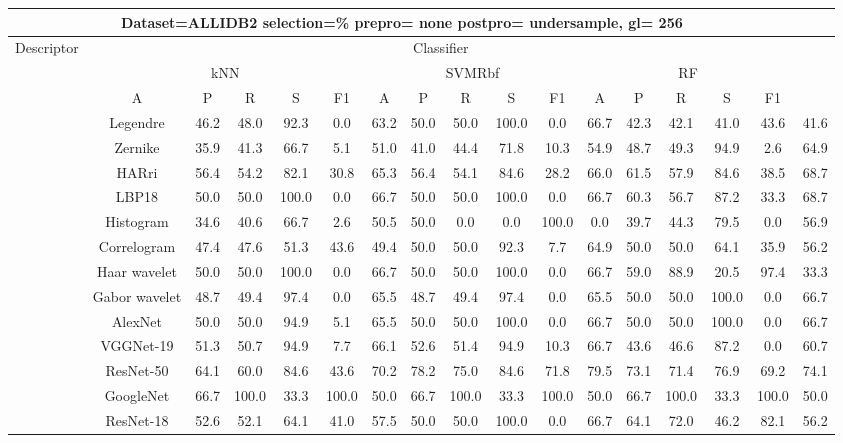 \documentclass[12pt,italian]{article}
\begin{document}
\begin{tiny}
\begin{longtable}{lcccccccccccccccc}
\toprule
\multicolumn{16}{c}{Dataset=ALLIDB2 selection=\% prepro= none postpro= undersample, gl= 256} \\ 
\toprule
Descriptor & \multicolumn{15}{c}{Classifier} \\ 
& \multicolumn{5}{c}{kNN} & \multicolumn{5}{c}{SVMRbf} & \multicolumn{5}{c}{RF} \\ 
& A & P & R & S & F1 & A & P & R & S & F1 & A & P & R & S & F1 \\ 
\midrule
& Legendre & 46.2 & 48.0 & 92.3 &  0.0 & 63.2 & 50.0 & 50.0 & 100.0 &  0.0 & 66.7 & 42.3 & 42.1 & 41.0 & 43.6 & 41.6 \\ 
& Zernike & 35.9 & 41.3 & 66.7 &  5.1 & 51.0 & 41.0 & 44.4 & 71.8 & 10.3 & 54.9 & 48.7 & 49.3 & 94.9 &  2.6 & 64.9 \\ 
& HARri & 56.4 & 54.2 & 82.1 & 30.8 & 65.3 & 56.4 & 54.1 & 84.6 & 28.2 & 66.0 & 61.5 & 57.9 & 84.6 & 38.5 & 68.7 \\ 
& LBP18 & 50.0 & 50.0 & 100.0 &  0.0 & 66.7 & 50.0 & 50.0 & 100.0 &  0.0 & 66.7 & 60.3 & 56.7 & 87.2 & 33.3 & 68.7 \\ 
& Histogram & 34.6 & 40.6 & 66.7 &  2.6 & 50.5 & 50.0 &  0.0 &  0.0 & 100.0 &  0.0 & 39.7 & 44.3 & 79.5 &  0.0 & 56.9 \\ 
& Correlogram & 47.4 & 47.6 & 51.3 & 43.6 & 49.4 & 50.0 & 50.0 & 92.3 &  7.7 & 64.9 & 50.0 & 50.0 & 64.1 & 35.9 & 56.2 \\ 
& Haar wavelet & 50.0 & 50.0 & 100.0 &  0.0 & 66.7 & 50.0 & 50.0 & 100.0 &  0.0 & 66.7 & 59.0 & 88.9 & 20.5 & 97.4 & 33.3 \\ 
& Gabor wavelet & 48.7 & 49.4 & 97.4 &  0.0 & 65.5 & 48.7 & 49.4 & 97.4 &  0.0 & 65.5 & 50.0 & 50.0 & 100.0 &  0.0 & 66.7 \\ 
& AlexNet & 50.0 & 50.0 & 94.9 &  5.1 & 65.5 & 50.0 & 50.0 & 100.0 &  0.0 & 66.7 & 50.0 & 50.0 & 100.0 &  0.0 & 66.7 \\ 
& VGGNet-19 & 51.3 & 50.7 & 94.9 &  7.7 & 66.1 & 52.6 & 51.4 & 94.9 & 10.3 & 66.7 & 43.6 & 46.6 & 87.2 &  0.0 & 60.7 \\ 
& ResNet-50 & 64.1 & 60.0 & 84.6 & 43.6 & 70.2 & 78.2 & 75.0 & 84.6 & 71.8 & 79.5 & 73.1 & 71.4 & 76.9 & 69.2 & 74.1 \\ 
& GoogleNet & 66.7 & 100.0 & 33.3 & 100.0 & 50.0 & 66.7 & 100.0 & 33.3 & 100.0 & 50.0 & 66.7 & 100.0 & 33.3 & 100.0 & 50.0 \\ 
& ResNet-18 & 52.6 & 52.1 & 64.1 & 41.0 & 57.5 & 50.0 & 50.0 & 100.0 &  0.0 & 66.7 & 64.1 & 72.0 & 46.2 & 82.1 & 56.2 \\ 

\end{longtable}
\end{tiny}
\end{document}
